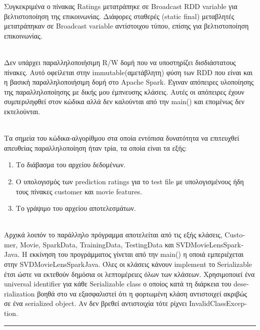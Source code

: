 \documentclass{report}
\begin{document}
Συγκεκριμένα ο πίνακας \textlatin{Ratings} μετατράπηκε σε \textlatin{Broadcast RDD variable} για βελτιστοποίηση της επικοινωνίας. 
Διάφορες σταθερές \textlatin{(static final)} μεταβλητές μετατράπηκαν σε \textlatin{Broadcast variable} αντίστοιχου τύπου, επίσης για βελτιστοποίηση επικοινωνίας. 

\\
Δεν υπάρχει παραλληλοποιήσιμη \textlatin{R/W} δομή που να υποστηρίζει δισδιάστατους πίνακες. Αυτό οφείλεται στην \textlatin{immutable}(αμετάβλητη) φύση των \textlatin{RDD} που είναι και η βασική παραλληλοποιήσιμη δομή στο \textlatin{Apache Spark}. Έγιναν απόπειρες υλοποίησης της παραλληλοποίησης με δικής μου έμπνευσης κλάσεις.
Αυτές οι απόπειρες έχουν συμπεριληφθεί στον κώδικα αλλά δεν καλούνται από την \textlatin{main}() και επομένως δεν εκτελούνται.

\\
Τα σημεία του κώδικα-αλγορίθμου στα οποία εντόπισα δυνατότητα να επιτευχθεί απευθείας παραλληλοποίηση ήταν τρία, τα οποία είναι τα εξής:

\begin{enumerate}
\item Το διάβασμα του αρχείου δεδομένων.
\item Ο υπολογισμός των \textlatin{prediction ratings} για το \textlatin{test file} με υπολογισμένους ήδη τους πίνακες \textlatin{customer} και \textlatin{movie features}.
\item Το γράψιμο του αρχείου αποτελεσμάτων.
\end{enumerate}
\\
Αρχικά λοιπόν το παράλληλο πρόγραμμα αποτελείται από τις εξής κλάσεις, \textlatin{Customer, Movie, SparkData, TrainingData, TestingData} και \textlatin{SVDMovieLensSparkJava}. Η εκκίνηση του προγράμματος γίνεται από την \textlatin{main}() η οποιά εμπεριέχεται στην \textlatin{SVDMovieLensSparkJava}. Όλες οι κλάσεις κάνουν \textlatin{implement} το \textlatin{Serializable} έτσι ώστε να εκτεθούν δημόσια οι λεπτομέρειες όλων των κλάσεων. Χρησιμοποιεί ένα \textlatin{universal identifier} για κάθε \textlatin{Serializable class} ο οποίος κατά τη διάρκεια του \textlatin{deserialization} βοηθά στο να εξασφαλιστεί ότι η φορτωμένη κλάση αντιστοιχεί ακριβώς σε ένα \textlatin{serialized object}. Αν δεν βρεθεί αντιστοιχία τότε ρίχνει \textlatin{InvalidClassException}. 


\rule{17cm}{0.1cm}

\end{document}
